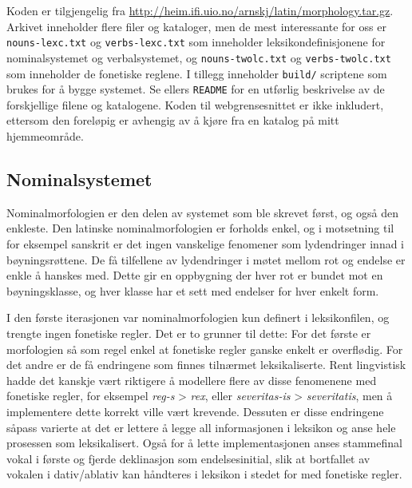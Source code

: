 \documentclass{article}
\newcommand\link[1]{\href{#1}{#1}}
\let\prog\texttt
\let\w\emph
\begin{document}
Koden er tilgjengelig fra
\link{http://heim.ifi.uio.no/arnskj/latin/morphology.tar.gz}. Arkivet
inneholder flere filer og kataloger, men de mest interessante for oss er
\prog{nouns-lexc.txt} og \prog{verbs-lexc.txt} som inneholder
leksikondefinisjonene for nominalsystemet og verbalsystemet, og
\prog{nouns-twolc.txt} og \prog{verbs-twolc.txt} som inneholder de fonetiske
reglene. I tillegg inneholder \prog{build/} scriptene som brukes for \aa{}
bygge systemet. Se ellers \prog{README} for en utf\o{}rlig beskrivelse av de
forskjellige filene og katalogene. Koden til webgrensesnittet er ikke
inkludert, ettersom den forel\o{}pig er avhengig av \aa{} kj\o{}re fra en
katalog p\aa{} mitt hjemmeomr\aa{}de.

\subsection{Nominalsystemet}
\label{deklinasjon}
Nominalmorfologien er den delen av systemet som ble skrevet f\o{}rst, og
ogs\aa{} den enkleste. Den latinske nominalmorfologien er forholds enkel, og i
motsetning til for eksempel sanskrit er det ingen vanskelige fenomener som
lydendringer innad i b\o{}yningsr\o{}ttene. De f\aa{} tilfellene av
lydendringer i m\o{}tet mellom rot og endelse er enkle \aa{} hanskes med.
Dette gir en oppbygning der hver rot er bundet mot en b\o{}yningsklasse, og
hver klasse har et sett med endelser for hver enkelt form.

I den f\o{}rste iterasjonen var nominalmorfologien kun definert i
leksikonfilen, og trengte ingen fonetiske regler. Det er to grunner til dette:
For det f\o{}rste er morfologien s\aa{} som regel enkel at fonetiske regler
ganske enkelt er overfl\o{}dig. For det andre er de f\aa{} endringene som
finnes tiln\ae{}rmet leksikaliserte. Rent lingvistisk hadde det kanskje
v\ae{}rt riktigere \aa{} modellere flere av disse fenomenene med fonetiske
regler, for eksempel \w{reg-s} > \w{rex}, eller \w{severitas-is} >
\w{severitatis}, men \aa{} implementere dette korrekt ville v\ae{}rt krevende.
Dessuten er disse endringene s\aa{}pass varierte at det er lettere \aa{} legge
all informasjonen i leksikon og anse hele prosessen som leksikalisert.
Ogs\aa{} for \aa{} lette implementasjonen anses stammefinal vokal i f\o{}rste
og fjerde deklinasjon som endelsesinitial, slik at bortfallet av vokalen i
dativ/ablativ kan h\aa{}ndteres i leksikon i stedet for med fonetiske regler.
\end{document}
